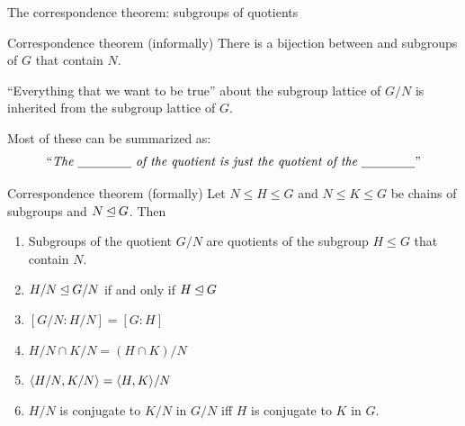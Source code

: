 \documentclass[8pt, handout]{beamer}
\newcommand{\Pause}{}      %
\begin{document}

\begin{frame}{The correspondence theorem: subgroups of quotients} %

  \begin{alertblock}{Correspondence theorem (informally)}
    There is a bijection between  and
    {\color{blue}subgroups of $G$ that contain $N$}. \medskip\Pause
    
    ``Everything that we want to be true'' about the subgroup lattice of $G/N$ 
    is inherited from the subgroup lattice of $G$. \medskip\Pause
    
    Most of these can be summarized as: 
    \[
    \text{``\emph{The \underline{\hspace{15mm}} of the quotient is
        just the quotient of the \underline{\hspace{15mm}}}''}
    \]
  \end{alertblock}
  
  \begin{block}{Correspondence theorem (formally)}
    Let $N\leq H\leq G$ and $N\leq K\leq G$ be chains of subgroups and
    $N\unlhd G$. Then
    \begin{enumerate}
    \item Subgroups of the quotient $G/N$ are quotients of the
      subgroup $H\leq G$ that contain $N$.
    \item $H/N\unlhd G/N$ if and only if $H\unlhd G$
    \item $[G/N:H/N]=[G:H]$
    \item $H/N\cap K/N=(H\cap K)/N$
    \item $\langle H/N,K/N\rangle=\langle H,K\rangle/N$
    \item $H/N$ is conjugate to $K/N$ in $G/N$ iff $H$ is
      conjugate to $K$ in $G$.
    \end{enumerate}
  \end{block}
  
\end{frame}

\end{document}
